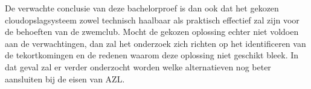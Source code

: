 De verwachte conclusie van deze bachelorproef is dan ook dat het gekozen cloudopslagsysteem zowel technisch haalbaar als praktisch effectief zal zijn voor de behoeften van de zwemclub. Mocht de gekozen oplossing echter niet voldoen aan de verwachtingen, dan zal het onderzoek zich richten op het identificeren van de tekortkomingen en de redenen waarom deze oplossing niet geschikt bleek. In dat geval zal er verder onderzocht worden welke alternatieven nog beter aansluiten bij de eisen van AZL.